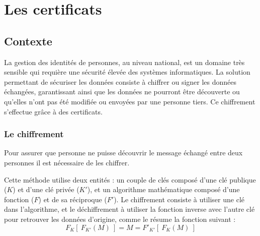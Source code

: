 \section{Les certificats}


\subsection{Contexte}

La gestion des identités de personnes, au niveau national, est un domaine très sensible qui requière une sécurité élevée des systèmes informatiques.
La solution permettant de sécuriser les données consiste à chiffrer ou signer les données échangées, garantissant ainsi que les données ne pourront être découverte ou qu'elles n'ont pas été modifiée ou envoyées par une personne tiers. Ce chiffrement s'effectue grâce à des certificats.


\subsubsection{Le chiffrement}

Pour assurer que personne ne puisse découvrir le message échangé entre deux personnes il est nécessaire de les chiffrer.

Cette méthode utilise deux entités : un couple de clés composé d'une clé publique ($K$) et d'une clé privée ($K'$), et un algorithme mathématique composé d'une fonction ($F$) et de sa réciproque ($F'$).
Le chiffrement consiste à utiliser une clé dans l'algorithme, et le déchiffrement à utiliser la fonction inverse avec l'autre clé pour retrouver les données d'origine, comme le résume la fonction suivant :
\[
F_K[\ F_{K'}(M)\ ] = M = F'_{K'}[\ F_K(M)\ ]
\]
\\

